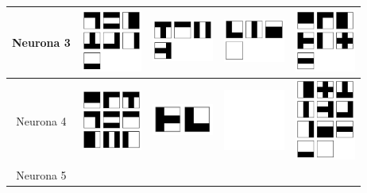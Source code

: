 \documentclass[12pt]{article}
\begin{document}
\begin{center}
\begin{tabular}{| c | c | c | c | c |}
     Neurona 3 &
     \includegraphics[width=2cm]{graficosde3neuronas/atributo2Clase0} &
     \includegraphics[width=2cm]{graficosde3neuronas/atributo2Clase1} &
     \includegraphics[width=2cm]{graficosde3neuronas/atributo2Clase2} &
     \includegraphics[width=2cm]{graficosde3neuronas/atributo2Clase3} \\ \hline
     Neurona 4 &
     \includegraphics[width=2cm]{graficosde3neuronas/atributo3Clase0} &
     \includegraphics[width=2cm]{graficosde3neuronas/atributo3Clase1} &
     \includegraphics[width=2cm]{graficosde3neuronas/atributo3Clase2} &
     \includegraphics[width=2cm]{graficosde3neuronas/atributo3Clase3} \\ \hline
     Neurona 5 &

\end{tabular}
\end{center}
\end{document}

